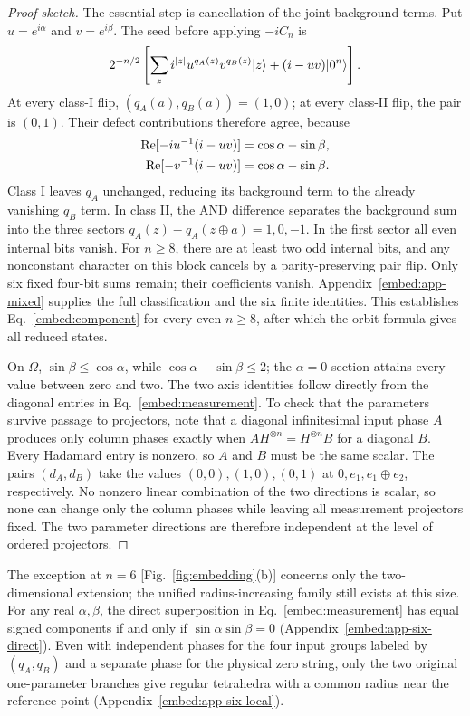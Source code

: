 \begin{proof}[Proof sketch]
The essential step is cancellation of the joint background terms. Put $u=e^{i\alpha}$ and $v=e^{i\beta}$. The seed before applying $-iC_n$ is
\begin{equation}
 2^{-n/2}\left[\sum_z i^{|z|}u^{q_A(z)}v^{q_B(z)}\lvert z\rangle
 +(i-uv)\lvert 0^n\rangle\right].
 \label{embed:seed}
\end{equation}
At every class-I flip, $(q_A(a),q_B(a))=(1,0)$; at every class-II flip, the pair is $(0,1)$. Their defect contributions therefore agree, because
\begin{align}
 \operatorname{Re}[-iu^{-1}(i-uv)]
 &=\cos\alpha-\sin\beta,\notag\\
 \operatorname{Re}[-v^{-1}(i-uv)]
 &=\cos\alpha-\sin\beta.
 \label{embed:defect}
\end{align}
Class I leaves $q_A$ unchanged, reducing its background term to the already vanishing $q_B$ term. In class II, the AND difference separates the background sum into the three sectors $q_A(z)-q_A(z\oplus a)=1,0,-1$. In the first sector all even internal bits vanish. For $n\ge8$, there are at least two odd internal bits, and any nonconstant character on this block cancels by a parity-preserving pair flip. Only six fixed four-bit sums remain; their coefficients vanish. Appendix~\ref{embed:app-mixed} supplies the full classification and the six finite identities. This establishes Eq.~\eqref{embed:component} for every even $n\ge8$, after which the orbit formula gives all reduced states.

On $\Omega$, $\sin\beta\le\cos\alpha$, while $\cos\alpha-\sin\beta\le2$; the $\alpha=0$ section attains every value between zero and two. The two axis identities follow directly from the diagonal entries in Eq.~\eqref{embed:measurement}. To check that the parameters survive passage to projectors, note that a diagonal infinitesimal input phase $A$ produces only column phases exactly when $AH^{\otimes n}=H^{\otimes n}B$ for a diagonal $B$. Every Hadamard entry is nonzero, so $A$ and $B$ must be the same scalar. The pairs $(d_A,d_B)$ take the values $(0,0),(1,0),(0,1)$ at $0,e_1,e_1\oplus e_2$, respectively. No nonzero linear combination of the two directions is scalar, so none can change only the column phases while leaving all measurement projectors fixed. The two parameter directions are therefore independent at the level of ordered projectors.
\end{proof}

The exception at $n=6$ [Fig.~\ref{fig:embedding}(b)] concerns only the two-dimensional extension; the unified radius-increasing family still exists at this size. For any real $\alpha,\beta$, the direct superposition in Eq.~\eqref{embed:measurement} has equal signed components if and only if $\sin\alpha\sin\beta=0$ (Appendix~\ref{embed:app-six-direct}). Even with independent phases for the four input groups labeled by $(q_A,q_B)$ and a separate phase for the physical zero string, only the two original one-parameter branches give regular tetrahedra with a common radius near the reference point (Appendix~\ref{embed:app-six-local}).

